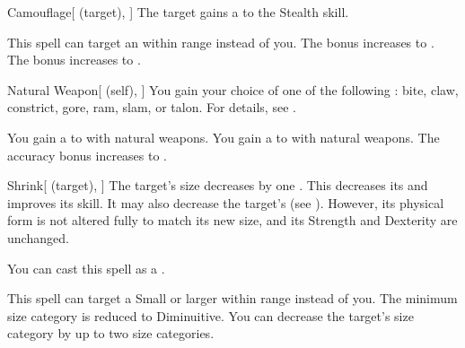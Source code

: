 \lowercase{\hypertarget{spell:Camouflage}{}}\label{spell:Camouflage}
\begin{attuneability}[Rank 1]{\hypertarget{spell:Camouflage}{Camouflage}}[ (target), ]
The target gains a   to the Stealth skill.

\rankline
{} This spell can target an  within \rngmed range instead of you.
 The bonus increases to .
 The bonus increases to .

\end{attuneability}
\vspace{0.25em}



\lowercase{\hypertarget{spell:Natural Weapon}{}}\label{spell:Natural Weapon}
\begin{attuneability}[Rank 1]{\hypertarget{spell:Natural Weapon}{Natural Weapon}}[ (self), ]
You gain your choice of one of the following : bite, claw, constrict, gore, ram, slam, or talon.
For details, see .

\rankline
{} You gain a   to  with natural weapons.
 You gain a   to  with natural weapons.
 The accuracy bonus increases to .

\end{attuneability}
\vspace{0.25em}



\lowercase{\hypertarget{spell:Shrink}{}}\label{spell:Shrink}
\begin{attuneability}[Rank 1]{\hypertarget{spell:Shrink}{Shrink}}[ (target), ]
The target's size decreases by one .
This decreases its  and improves its  skill.
It may also decrease the target's  (see ).
However, its physical form is not altered fully to match its new size, and its Strength and Dexterity are unchanged.

You can cast this spell as a .

\rankline
{} This spell can target a Small or larger  within \rngmed range instead of you.
 The minimum size category is reduced to Diminuitive.
 You can decrease the target's size category by up to two size categories.

\end{attuneability}
\vspace{0.25em}



